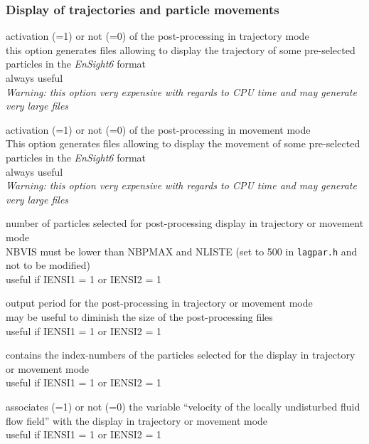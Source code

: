 \subsubsection{Display of trajectories and particle movements}

{activation (=1) or not (=0) of the post-processing in trajectory mode\\
this option generates files allowing to display the trajectory of
some pre-selected particles in the \textit{EnSight6} format\\
always useful\\
{\em Warning: this option very expensive with regards to CPU time and may
generate very large files}}

{activation (=1) or not (=0) of the post-processing in movement
mode\\
This option generates files allowing to display the movement of
some pre-selected particles in the \textit{EnSight6} format\\
always useful\\
{\em Warning: this option very expensive with regards to CPU time and may
generate very large files}}

{number of particles selected for post-processing display in trajectory or
movement mode\\ 
NBVIS must be lower than NBPMAX and NLISTE (set to 500 in \texttt{lagpar.h} and
not to be modified)\\
useful if IENSI1 = 1 or IENSI2 = 1}

{output period for the post-processing in trajectory or
movement mode\\
may be useful to diminish the size of the post-processing files\\ 
useful if IENSI1 = 1 or IENSI2 = 1}

{contains the index-numbers of the particles selected for the display in
trajectory or movement mode\\ 
useful if IENSI1 = 1 or IENSI2 = 1}

{associates (=1) or not (=0) the variable ``velocity of the locally
undisturbed fluid flow field'' with the display in trajectory or
movement mode\\ 
useful if IENSI1 = 1 or IENSI2 = 1}

